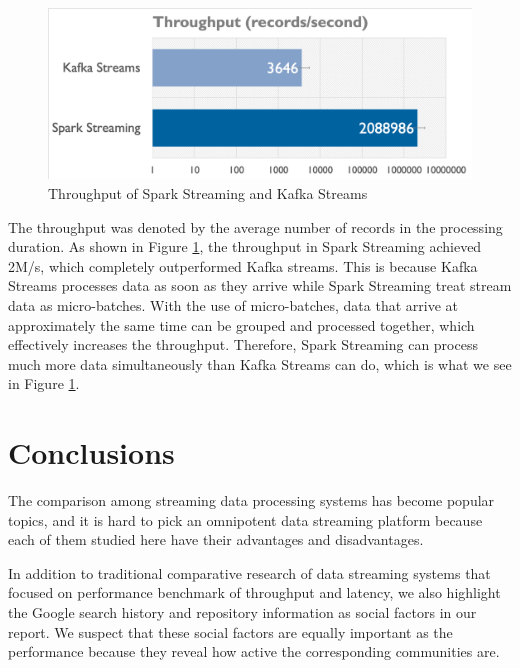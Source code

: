 \documentclass[pdftex,twocolumn,10pt,letterpaper]{article}
\begin{document}
\begin{figure}
    \centering
    \includegraphics[width=\linewidth]{throughput.png}
    \caption{Throughput of Spark Streaming and Kafka Streams}
    \label{fig:throughput}
\end{figure}


The throughput was denoted by the average number of records in the processing duration. As shown in Figure \ref{fig:throughput}, the throughput in Spark Streaming achieved 2M/s, which completely outperformed Kafka streams. This is because Kafka Streams processes data as soon as they arrive while Spark Streaming treat stream data as micro-batches. With the use of micro-batches, data that arrive at approximately the same time can be grouped and processed together, which effectively increases the throughput. Therefore, Spark Streaming can process much more data simultaneously than Kafka Streams can do, which is what we see in Figure \ref{fig:throughput}. 

\section{Conclusions}
The comparison among streaming data processing systems has become popular topics, and it is hard to pick an omnipotent data streaming platform because each of them studied here have their advantages and disadvantages.

In addition to traditional comparative research of data streaming systems that focused on performance benchmark of throughput and latency, we also highlight the Google search history and repository information as social factors in our report. We suspect that these social factors are equally important as the performance because they reveal how active the corresponding communities are. 
\end{document}
